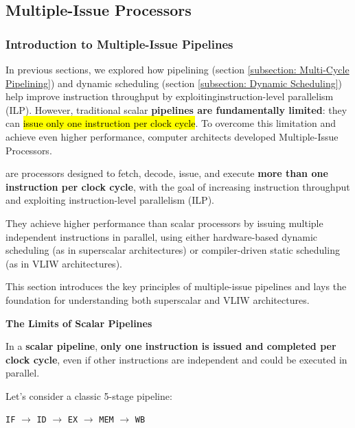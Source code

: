 \subsection{Multiple-Issue Processors}

\subsubsection{Introduction to Multiple-Issue Pipelines}

In previous sections, we explored how pipelining (section \ref{subsection: Multi-Cycle Pipelining}) and dynamic scheduling (section \ref{subsection: Dynamic Scheduling}) help improve instruction throughput by exploiting\break instruction-level parallelism (ILP). However, traditional scalar \textbf{pipelines are fundamentally limited}: they can \hl{issue only one instruction per clock cycle}. To overcome this limitation and achieve even higher performance, computer architects developed Multiple-Issue Processors.

\highspace
\begin{definitionbox}
     are processors designed to fetch, decode, issue, and execute \textbf{more than one instruction per clock cycle}, with the goal of increasing instruction throughput and exploiting instruction-level parallelism (ILP).
\end{definitionbox}

\noindent
They achieve higher performance than scalar processors by issuing multiple independent instructions in parallel, using either hardware-based dynamic scheduling (as in superscalar architectures) or compiler-driven static scheduling (as in VLIW architectures).

\highspace
This section introduces the key principles of multiple-issue pipelines and lays the foundation for understanding both superscalar and VLIW architectures.

\highspace
\begin{flushleft}
    \textcolor{Red2}{ \textbf{The Limits of Scalar Pipelines}}
\end{flushleft}
In a \textbf{scalar pipeline}, \textbf{only one instruction is issued and completed per clock cycle}, even if other instructions are independent and could be executed in parallel.

\highspace
Let's consider a classic 5-stage pipeline:
\begin{center}
    \texttt{IF} $\rightarrow$ \texttt{ID} $\rightarrow$ \texttt{EX} $\rightarrow$ \texttt{MEM} $\rightarrow$ \texttt{WB}
\end{center}

